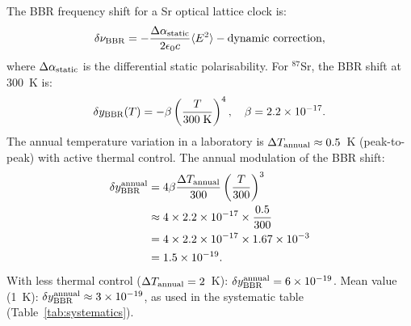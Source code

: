 \documentclass[aps,prd,twocolumn,superscriptaddress,nofootinbib]{revtex4-2}
\begin{document}
The BBR frequency shift for a Sr optical lattice clock is:
\begin{equation}
\delta\nu_{\rm BBR} = -\frac{\Delta\alpha_{\rm static}}{2\epsilon_0 c}
\langle E^2\rangle - \text{dynamic correction},
\end{equation}
where $\Delta\alpha_{\rm static}$ is the differential static polarisability.
For $^{87}$Sr, the BBR shift at 300~K is:
\begin{equation}
\delta y_{\rm BBR}(T) = -\beta\left(\frac{T}{300\;\text{K}}\right)^4,
\quad \beta = 2.2\times10^{-17}.
\label{eq:bbr}
\end{equation}
The annual temperature variation in a laboratory is $\Delta T_{\rm annual}
\approx 0.5$~K (peak-to-peak) with active thermal control. The annual
modulation of the BBR shift:
\begin{align}
\delta y_{\rm BBR}^{\rm annual} &= 4\beta\frac{\Delta T_{\rm annual}}{300}
\left(\frac{T}{300}\right)^3 \nonumber\\
&\approx 4\times2.2\times10^{-17}\times\frac{0.5}{300} \nonumber\\
&= 4\times2.2\times10^{-17}\times1.67\times10^{-3} \nonumber\\
&= 1.5\times10^{-19}.
\label{eq:bbr_annual}
\end{align}
With less thermal control ($\Delta T_{\rm annual} = 2$~K): $\delta y_{\rm BBR}^{\rm annual}
= 6\times10^{-19}$.
Mean value (1~K): $\delta y_{\rm BBR}^{\rm annual} \approx 3\times10^{-19}$,
as used in the systematic table (Table~\ref{tab:systematics}).
\end{document}
